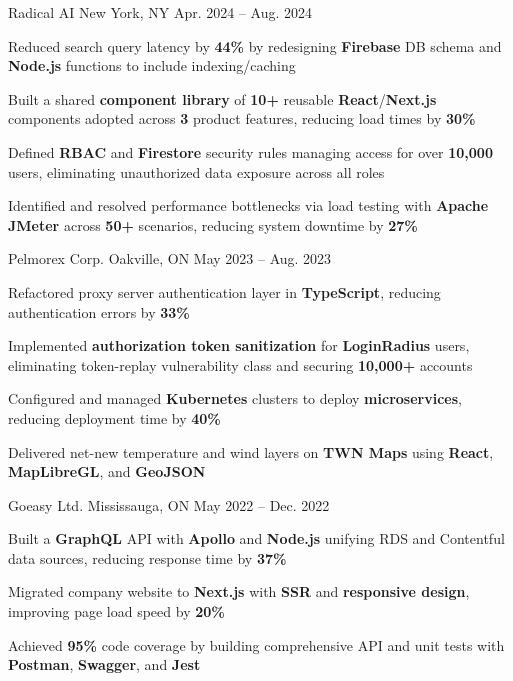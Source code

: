 \documentclass[11pt, a4paper]{awesome-cv}
\begin{document}
\begin{cventries}
  \cventry
    {\color{lightblue}{SOFTWARE ENGINEER INTERN}}
    {Radical AI}
    {New York, NY}
    {Apr. 2024 -- Aug. 2024}
    {
      \begin{cvitems}
        \item{Reduced search query latency by \textbf{44\%} by redesigning \textbf{Firebase} DB schema and \textbf{Node.js} functions to include indexing/caching}
        \item{Built a shared \textbf{component library} of \textbf{10+} reusable \textbf{React}/\textbf{Next.js} components adopted across \textbf{3} product features, reducing load times by \textbf{30\%}}
        \item{Defined \textbf{RBAC} and \textbf{Firestore} security rules managing access for over \textbf{10,000} users, eliminating unauthorized data exposure across all roles}
        \item{Identified and resolved performance bottlenecks via load testing with \textbf{Apache JMeter} across \textbf{50+} scenarios, reducing system downtime by \textbf{27\%}}
      \end{cvitems}
    }

  \vspace{3mm}

  \cventry
    {\color{lightblue}{SOFTWARE ENGINEER INTERN}}
    {Pelmorex Corp.}
    {Oakville, ON}
    {May 2023 -- Aug. 2023}
    {
      \begin{cvitems}
        \item{Refactored proxy server authentication layer in \textbf{TypeScript}, reducing authentication errors by \textbf{33\%}}
        \item{Implemented \textbf{authorization token sanitization} for \textbf{LoginRadius} users, eliminating token-replay vulnerability class and securing \textbf{10,000+} accounts}
        \item{Configured and managed \textbf{Kubernetes} clusters to deploy \textbf{microservices}, reducing deployment time by \textbf{40\%}}
        \item{Delivered net-new temperature and wind layers on \textbf{TWN Maps} using \textbf{React}, \textbf{MapLibreGL}, and \textbf{GeoJSON}}
      \end{cvitems}
    }

  \vspace{3mm}

  \cventry
    {\color{lightblue}{FRONT-END DEVELOPER INTERN}}
    {Goeasy Ltd.}
    {Mississauga, ON}
    {May 2022 -- Dec. 2022}
    {
      \begin{cvitems}
        \item{Built a \textbf{GraphQL} API with \textbf{Apollo} and \textbf{Node.js} unifying RDS and Contentful data sources, reducing response time by \textbf{37\%}}
        \item{Migrated company website to \textbf{Next.js} with \textbf{SSR} and \textbf{responsive design}, improving page load speed by \textbf{20\%}}
        \item{Achieved \textbf{95\%} code coverage by building comprehensive API and unit tests with \textbf{Postman}, \textbf{Swagger}, and \textbf{Jest}}
      \end{cvitems}
    }


\end{cventries}
\end{document}
